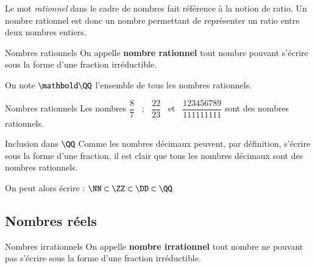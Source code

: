\documentclass[oneside,12pt]{article}          %
\begin{document}
Le mot \textit{rationnel} dans le cadre de nombres fait référence à la notion de ratio. Un nombre rationnel est donc un nombre permettant de représenter un ratio entre deux nombres entiers.

\begin{definition}{Nombres rationnels}
	On appelle \textbf{nombre rationnel} tout nombre pouvant s'écrire sous la forme d'une fraction irréductible.

	On note $\mathbold \QQ$ l'ensemble de tous les nombres rationnels.
\end{definition}

\begin{exemple}{Nombres rationnels}
	Les nombres $\dfrac{8}{7}$ ~;~ $\dfrac{22}{23}$ ~et~ $\dfrac{123456789}{111111111}$ sont des nombres rationnels.
\end{exemple}



\begin{propriete}{Inclusion dans $\QQ$}
	Comme les nombres décimaux peuvent, par définition, s'écrire sous la forme d'une fraction, il est clair 	que tous les nombres décimaux sont des nombres rationnels.
	
	On peut alors écrire : $\NN\subset\ZZ\subset\DD\subset\QQ$
\end{propriete}


\subsection{Nombres réels}

\begin{definition}{Nombres irrationnels}
	On appelle \textbf{nombre irrationnel} tout nombre ne pouvant pas s'écrire sous la forme d'une fraction irréductible.
\end{definition}
\end{document}
